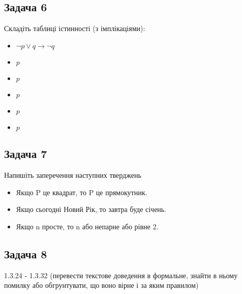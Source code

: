 \documentclass{article}
\begin{document}
\subsection*{Задача 6}
Складіть таблиці істинності (з імплікаціями):
\begin{itemize}
    \item $\lnot p \lor q \rightarrow \lnot q$
    \item $p$
    \item $p$
    \item $p$
    \item $p$
    \item $p$
\end{itemize}


\subsection*{Задача 7}
Напишіть заперечення наступних тверджень
\begin{itemize}
    \item Якщо P це квадрат, то P це прямокутник.
    \item Якщо сьогодні Новий Рік, то завтра буде січень.
    \item Якщо n просте, то n або непарне або рівне 2.
\end{itemize}

\subsection*{Задача 8}
1.3.24 - 1.3.32 (перевести текстове доведення в формальне, знайти в ньому помилку або обгрунтувати, що воно вірне і за яким правилом)
\end{document}
